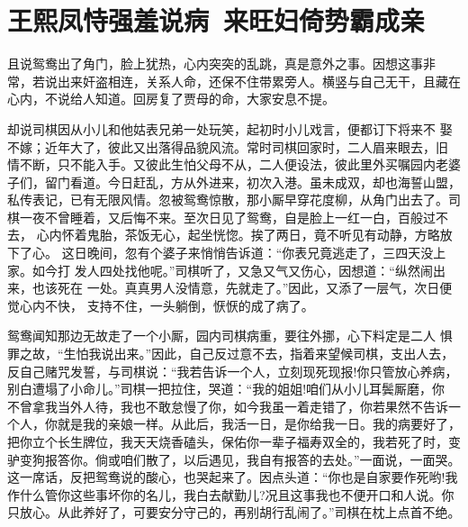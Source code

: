 \chapter{王熙凤恃强羞说病~来旺妇倚势霸成亲}

且说鸳鸯出了角门，脸上犹热，心内突突的乱跳，真是意外之事。因想这事非
常，若说出来奸盗相连，关系人命，还保不住带累旁人。横竖与自己无干，且藏在
心内，不说给人知道。回房复了贾母的命，大家安息不提。

却说司棋因从小儿和他姑表兄弟一处玩笑，起初时小儿戏言，便都订下将来不
娶不嫁；近年大了，彼此又出落得品貌风流。常时司棋回家时，二人眉来眼去，旧
情不断，只不能入手。又彼此生怕父母不从，二人便设法，彼此里外买嘱园内老婆
子们，留门看道。今日赶乱，方从外进来，初次入港。虽未成双，却也海誓山盟，
私传表记，已有无限风情。忽被鸳鸯惊散，那小厮早穿花度柳，从角门出去了。司
棋一夜不曾睡着，又后悔不来。至次日见了鸳鸯，自是脸上一红一白，百般过不去，
心内怀着鬼胎，茶饭无心，起坐恍惚。挨了两日，竟不听见有动静，方略放下了心。
这日晚间，忽有个婆子来悄悄告诉道：“你表兄竟逃走了，三四天没上家。如今打
发人四处找他呢。”司棋听了，又急又气又伤心，因想道：“纵然闹出来，也该死在
一处。真真男人没情意，先就走了。”因此，又添了一层气，次日便觉心内不快，
支持不住，一头躺倒，恹恹的成了病了。

鸳鸯闻知那边无故走了一个小厮，园内司棋病重，要往外挪，心下料定是二人
惧罪之故，“生怕我说出来。”因此，自己反过意不去，指着来望候司棋，支出人去，
反自己赌咒发誓，与司棋说：“我若告诉一个人，立刻现死现报!你只管放心养病，
别白遭塌了小命儿。”司棋一把拉住，哭道：“我的姐姐!咱们从小儿耳鬓厮磨，你
不曾拿我当外人待，我也不敢怠慢了你，如今我虽一着走错了，你若果然不告诉一
个人，你就是我的亲娘一样。从此后，我活一日，是你给我一日。我的病要好了，
把你立个长生牌位，我天天烧香磕头，保佑你一辈子福寿双全的，我若死了时，变
驴变狗报答你。倘或咱们散了，以后遇见，我自有报答的去处。”一面说，一面哭。
这一席话，反把鸳鸯说的酸心，也哭起来了。因点头道：“你也是自家要作死哟!我
作什么管你这些事坏你的名儿，我白去献勤儿?况且这事我也不便开口和人说。你
只放心。从此养好了，可要安分守己的，再别胡行乱闹了。”司棋在枕上点首不绝。


